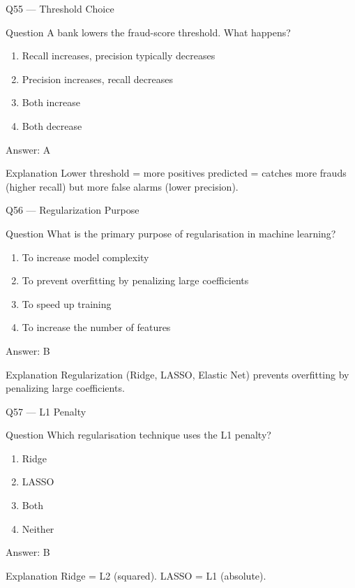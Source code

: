\documentclass[aspectratio=169,8pt]{beamer}
\begin{document}
	\begin{frame}{Q55 --- Threshold Choice}
		\begin{block}{Question}
			A bank lowers the fraud-score threshold. What happens?
		\end{block}
		\begin{enumerate}
			\item Recall increases, precision typically decreases
			\item Precision increases, recall decreases
			\item Both increase
			\item Both decrease
		\end{enumerate}
		\begin{exampleblock}{Answer: A}\end{exampleblock}
		\begin{block}{Explanation}
			Lower threshold = more positives predicted = catches more frauds (higher recall) but more false alarms (lower precision).
		\end{block}
	\end{frame}
	
	\begin{frame}{Q56 --- Regularization Purpose}
		\begin{block}{Question}
			What is the primary purpose of regularisation in machine learning?
		\end{block}
		\begin{enumerate}
			\item To increase model complexity
			\item To prevent overfitting by penalizing large coefficients
			\item To speed up training
			\item To increase the number of features
		\end{enumerate}
		\begin{exampleblock}{Answer: B}\end{exampleblock}
		\begin{block}{Explanation}
			Regularization (Ridge, LASSO, Elastic Net) prevents overfitting by penalizing large coefficients.
		\end{block}
	\end{frame}
	
	\begin{frame}{Q57 --- L1 Penalty}
		\begin{block}{Question}
			Which regularisation technique uses the L1 penalty?
		\end{block}
		\begin{enumerate}
			\item Ridge
			\item LASSO
			\item Both
			\item Neither
		\end{enumerate}
		\begin{exampleblock}{Answer: B}\end{exampleblock}
		\begin{block}{Explanation}
			Ridge = L2 (squared). LASSO = L1 (absolute).
		\end{block}
	\end{frame}
	
\end{document}
